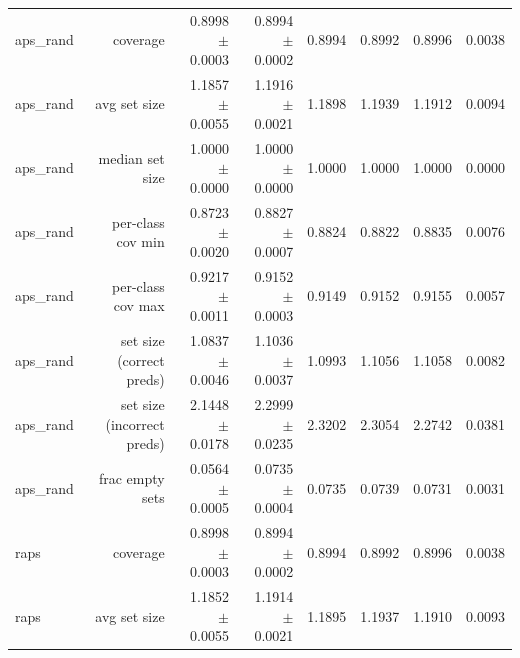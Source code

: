 \begin{table}
\begin{tabular}{lrrrrrrr}
         aps\_rand &                   coverage &                         0.8998 $\pm$ 0.0003 &                           0.8994 $\pm$ 0.0002 &     0.8994 &     0.8992 &     0.8996 &                                    0.0038 \\
         aps\_rand &               avg set size &                         1.1857 $\pm$ 0.0055 &                           1.1916 $\pm$ 0.0021 &     1.1898 &     1.1939 &     1.1912 &                                    0.0094 \\
         aps\_rand &            median set size &                         1.0000 $\pm$ 0.0000 &                           1.0000 $\pm$ 0.0000 &     1.0000 &     1.0000 &     1.0000 &                                    0.0000 \\
         aps\_rand &          per-class cov min &                         0.8723 $\pm$ 0.0020 &                           0.8827 $\pm$ 0.0007 &     0.8824 &     0.8822 &     0.8835 &                                    0.0076 \\
         aps\_rand &          per-class cov max &                         0.9217 $\pm$ 0.0011 &                           0.9152 $\pm$ 0.0003 &     0.9149 &     0.9152 &     0.9155 &                                    0.0057 \\
         aps\_rand &   set size (correct preds) &                         1.0837 $\pm$ 0.0046 &                           1.1036 $\pm$ 0.0037 &     1.0993 &     1.1056 &     1.1058 &                                    0.0082 \\
         aps\_rand & set size (incorrect preds) &                         2.1448 $\pm$ 0.0178 &                           2.2999 $\pm$ 0.0235 &     2.3202 &     2.3054 &     2.2742 &                                    0.0381 \\
         aps\_rand &            frac empty sets &                         0.0564 $\pm$ 0.0005 &                           0.0735 $\pm$ 0.0004 &     0.0735 &     0.0739 &     0.0731 &                                    0.0031 \\
             raps &                   coverage &                         0.8998 $\pm$ 0.0003 &                           0.8994 $\pm$ 0.0002 &     0.8994 &     0.8992 &     0.8996 &                                    0.0038 \\
             raps &               avg set size &                         1.1852 $\pm$ 0.0055 &                           1.1914 $\pm$ 0.0021 &     1.1895 &     1.1937 &     1.1910 &                                    0.0093 \\

\end{tabular}
\end{table}
